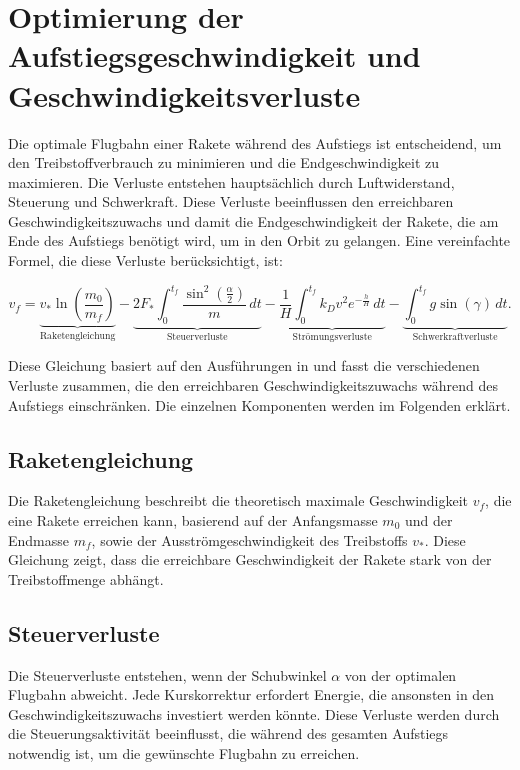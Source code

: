 %
%
%
%

\section{Optimierung der Aufstiegsgeschwindigkeit und Geschwindigkeitsverluste \label{leo:section:aufstiegsgleichung}}

Die optimale Flugbahn einer Rakete während des Aufstiegs ist entscheidend, um den Treibstoffverbrauch zu minimieren und die Endgeschwindigkeit zu maximieren. 
Die Verluste entstehen hauptsächlich durch Luftwiderstand, Steuerung und Schwerkraft. 
Diese Verluste beeinflussen den erreichbaren Geschwindigkeitszuwachs und damit die Endgeschwindigkeit der Rakete, die am Ende des Aufstiegs benötigt wird, um in den Orbit zu gelangen. 
Eine vereinfachte Formel, die diese Verluste berücksichtigt, ist:

\begin{equation}
	v_f = \underbrace{v_* \ln \left(\frac{m_0}{m_f}\right)}_{\text{Raketengleichung}} 
	- \underbrace{2F_* \int_0^{t_f} \frac{\sin^2\left(\frac{\alpha}{2}\right)}{m} \, dt }_{\text{Steuerverluste}}
	- \underbrace{\frac{1}{H} \int_0^{t_f} k_Dv^2 e^{-\frac{h}{H}} \, dt }_{\text{Strömungsverluste}}
	- \underbrace{\int_0^{t_f} g \sin \left(\gamma\right) \, dt}_{\text{Schwerkraftverluste}}.
	\label{leo:aufstiegsgleichung}
\end{equation}

Diese Gleichung basiert auf den Ausführungen in \cite{leo:astronautics} und fasst die verschiedenen Verluste zusammen, die den erreichbaren Geschwindigkeitszuwachs während des Aufstiegs einschränken. 
Die einzelnen Komponenten werden im Folgenden erklärt.

\subsection{Raketengleichung}
Die Raketengleichung beschreibt die theoretisch maximale Geschwindigkeit \(v_f\), die eine Rakete erreichen kann, basierend auf der Anfangsmasse \(m_0\) und der Endmasse \(m_f\), sowie der Ausströmgeschwindigkeit des Treibstoffs \(v_*\). 
Diese Gleichung zeigt, dass die erreichbare Geschwindigkeit der Rakete stark von der Treibstoffmenge abhängt.

\subsection{Steuerverluste}
Die Steuerverluste entstehen, wenn der Schubwinkel \(\alpha\) von der optimalen Flugbahn abweicht. 
Jede Kurskorrektur erfordert Energie, die ansonsten in den Geschwindigkeitszuwachs investiert werden könnte. 
Diese Verluste werden durch die Steuerungsaktivität beeinflusst, die während des gesamten Aufstiegs notwendig ist, um die gewünschte Flugbahn zu erreichen.

